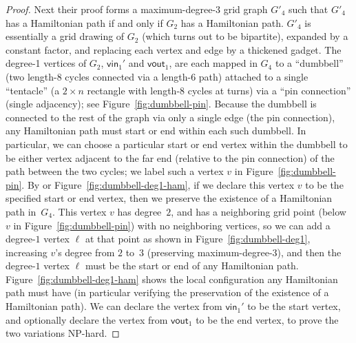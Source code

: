 \documentclass[11pt,letterpaper]{article}
\theoremstyle{plain}
\theoremstyle{definition}
\theoremstyle{remark}
\numberwithin{equation}{section}
\begin{document}
\begin{proof}
  Next their proof forms a maximum-degree-$3$ grid graph $G'_4$ such that
  $G'_4$ has a Hamiltonian path if and only if $G_2$ has a Hamiltonian path.
  $G'_4$ is essentially a grid drawing of $G_2$
  (which turns out to be bipartite), expanded by a constant factor,
  and replacing each vertex and edge by a thickened gadget.
  The degree-1 vertices of $G_2$, $\textsf{vin}_1'$ and $\textsf{vout}_1$,
  are each mapped in $G_4$ to a ``dumbbell''
  (two length-$8$ cycles connected via a length-$6$ path)
  attached to a single ``tentacle''
  (a $2 \times n$ rectangle with length-$8$ cycles at turns)
  via a ``pin connection'' (single adjacency);
  see Figure~\ref{fig:dumbbell-pin}.
  Because the dumbbell is connected to the rest of the graph via only
  a single edge (the pin connection),
  any Hamiltonian path must start or end within each such dumbbell.
  In particular, we can choose a particular start or end vertex within
  the dumbbell to be either vertex adjacent to the far end
  (relative to the pin connection) of the path between the two cycles;
  we label such a vertex $v$ in Figure~\ref{fig:dumbbell-pin}.
  By \cite[Lemma]{Degree3GridHamPath} or Figure~\ref{fig:dumbbell-deg1-ham},
  if we declare this vertex $v$ to be the specified start or end vertex,
  then we preserve the existence of a Hamiltonian path in~$G_4$.
  This vertex $v$ has degree~$2$, and has a neighboring grid point
  (below $v$ in Figure~\ref{fig:dumbbell-pin})
  with no neighboring vertices, so we can add a degree-$1$ vertex $\ell$
  at that point as shown in Figure~\ref{fig:dumbbell-deg1},
  increasing $v$'s degree from $2$ to~$3$ (preserving maximum-degree-$3$),
  and then the degree-$1$ vertex $\ell$ must be the start or end of any
  Hamiltonian path.
  Figure~\ref{fig:dumbbell-deg1-ham} shows the local configuration any
  Hamiltonian path must have (in particular verifying the preservation of
  the existence of a Hamiltonian path).
  We can declare the vertex from $\textsf{vin}_1'$ to be the start vertex,
  and optionally declare the vertex from $\textsf{vout}_1$ to be the end vertex,
  to prove the two variations NP-hard.
\end{proof}
\end{document}
